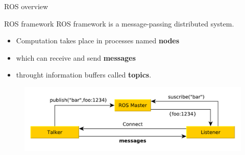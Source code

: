 \begin{frame}[allowframebreaks]{ROS overview}
 \framebreak
 
 \begin{block}{ROS framework} 
 ROS framework is a message-passing distributed system. 
 \begin{itemize}
  \item Computation takes place in processes named \textbf{nodes} 
  \item which can receive and send \textbf{messages} 
  \item throught information buffers called \textbf{topics}. 
 \end{itemize}  
 
 \end{block}
 
 \begin{figure}
  \includegraphics[width=.8\textwidth]{./img/ros/ros.pdf}
 \end{figure}
\end{frame}

